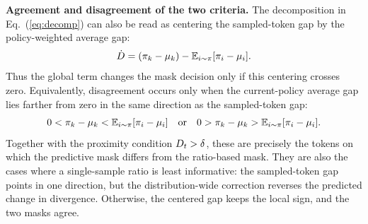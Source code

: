 \noindent\textbf{Agreement and disagreement of the two criteria.}
The decomposition in Eq.~(\ref{eq:decomp}) can also be read as centering the
sampled-token gap by the policy-weighted average gap:
\[
\dot{D}
=
(\pi_k-\mu_k)-\mathbb{E}_{i\sim\pi}[\pi_i-\mu_i].
\]
Thus the global term changes the mask decision only if this centering crosses
zero.
Equivalently, disagreement occurs only when the current-policy average gap lies
farther from zero in the same direction as the sampled-token gap:
\begin{equation}
\label{eq:recovery}
0<\pi_k-\mu_k<\mathbb{E}_{i\sim\pi}[\pi_i-\mu_i]
\quad\text{or}\quad
0>\pi_k-\mu_k>\mathbb{E}_{i\sim\pi}[\pi_i-\mu_i].
\end{equation}
Together with the proximity condition $D_t>\delta$, these are precisely the
tokens on which the predictive mask differs from the ratio-based mask.
They are also the cases where a single-sample ratio is least informative: the
sampled-token gap points in one direction, but the distribution-wide correction
reverses the predicted change in divergence.
Otherwise, the centered gap keeps the local sign, and the two masks agree.
